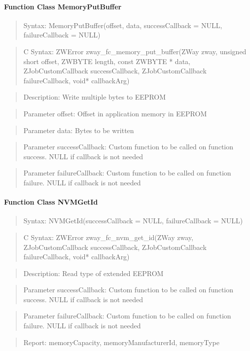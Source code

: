 \paragraph{Function Class MemoryPutBuffer}
\begin{quote}Syntax: MemoryPutBuffer(offset, data, successCallback = NULL, failureCallback = NULL)\end{quote}
\begin{quote}C Syntax: ZWError zway\_fc\_memory\_put\_buffer(ZWay zway, unsigned short offset, ZWBYTE length, const ZWBYTE * data, ZJobCustomCallback successCallback, ZJobCustomCallback failureCallback, void* callbackArg)\end{quote}
\begin{quote}Description: Write multiple bytes to EEPROM\end{quote}
\begin{quote}Parameter offset: Offset in application memory in EEPROM\end{quote}
\begin{quote}Parameter data: Bytes to be written\end{quote}
\begin{quote}Parameter successCallback: Custom function to be called on function success. NULL if callback is not needed\end{quote}
\begin{quote}Parameter failureCallback: Custom function to be called on function failure. NULL if callback is not needed\end{quote}


\paragraph{Function Class NVMGetId}
\begin{quote}Syntax: NVMGetId(successCallback = NULL, failureCallback = NULL)\end{quote}
\begin{quote}C Syntax: ZWError zway\_fc\_nvm\_get\_id(ZWay zway, ZJobCustomCallback successCallback, ZJobCustomCallback failureCallback, void* callbackArg)\end{quote}
\begin{quote}Description: Read type of extended EEPROM\end{quote}
\begin{quote}Parameter successCallback: Custom function to be called on function success. NULL if callback is not needed\end{quote}
\begin{quote}Parameter failureCallback: Custom function to be called on function failure. NULL if callback is not needed\end{quote}
\begin{quote}Report: memoryCapacity, memoryManufacturerId, memoryType\end{quote}

